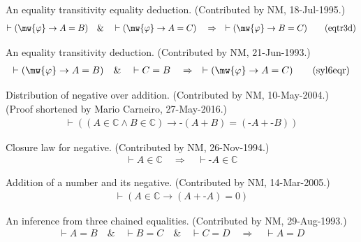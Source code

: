 \begin{lemma} An equality transitivity equality deduction.
(Contributed by NM,
       18-Jul-1995.)
\begin{align}
\vdash ( \mw{\varphi} \rightarrow A = B )\quad\&\quad \vdash ( \mw{\varphi}
    \rightarrow A = C )\quad\Rightarrow\quad \vdash ( \mw{\varphi} \rightarrow
    B = C )\label{eq:eqtr3d}\tag{eqtr3d}
\end{align}
\end{lemma}


\begin{lemma} An equality transitivity deduction. 
(Contributed by NM,
       21-Jun-1993.)
\begin{align}
\vdash ( \mw{\varphi} \rightarrow A = B )\quad\&\quad \vdash C =
    B\quad\Rightarrow\quad \vdash ( \mw{\varphi} \rightarrow A = C
    )\label{eq:syl6eqr}\tag{syl6eqr}
\end{align}
\end{lemma}


\begin{lemma} Distribution of negative over addition. 
(Contributed by NM, 10-May-2004.)
     (Proof shortened by Mario Carneiro, 27-May-2016.)
\begin{align}
\vdash ( ( A \in \mathbb{C} \wedge B \in \mathbb{C} ) \rightarrow \textrm{-} (
    A + B ) = ( \textrm{-} A + \textrm{-} B ) )\label{eq:negdi}\tag{negdi}
\end{align}
\end{lemma}


\begin{lemma} Closure law for negative.  (Contributed by
NM, 26-Nov-1994.)
\begin{align}
\vdash A \in \mathbb{C}\quad\Rightarrow\quad \vdash \textrm{-} A \in
    \mathbb{C}\label{eq:negcli}\tag{negcli}
\end{align}
\end{lemma}


\begin{lemma} Addition of a number and its negative. 
(Contributed by NM,
     14-Mar-2005.)
\begin{align}
\vdash ( A \in \mathbb{C} \rightarrow ( A + \textrm{-} A ) = 0
    )\label{eq:negid}\tag{negid}
\end{align}
\end{lemma}


\begin{lemma} An inference from three chained equalities. 
(Contributed by NM,
       29-Aug-1993.)
\begin{align}
\vdash A = B\quad\&\quad \vdash B = C\quad\&\quad \vdash C =
    D\quad\Rightarrow\quad \vdash A = D\label{eq:3eqtri}\tag{3eqtri}
\end{align}
\end{lemma}


